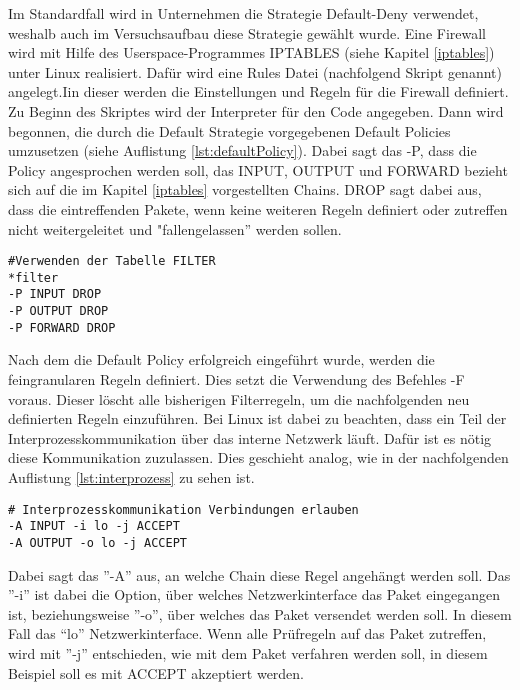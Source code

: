 Im Standardfall wird in Unternehmen die Strategie Default-Deny verwendet, weshalb auch im Versuchsaufbau diese Strategie gewählt wurde. Eine Firewall wird mit Hilfe des Userspace-Programmes IPTABLES (siehe Kapitel \ref{iptables}) unter Linux realisiert. Dafür wird eine Rules Datei (nachfolgend Skript genannt) angelegt.Iin dieser werden die Einstellungen und Regeln für die Firewall definiert. Zu Beginn des Skriptes wird der Interpreter für den Code angegeben. Dann wird begonnen, die durch die Default Strategie vorgegebenen Default Policies umzusetzen (siehe Auflistung \ref{lst:defaultPolicy}). Dabei sagt das -P, dass die Policy angesprochen werden soll, das INPUT, OUTPUT und FORWARD bezieht sich auf die im Kapitel \ref{iptables} vorgestellten Chains. DROP sagt dabei aus, dass die eintreffenden Pakete, wenn keine weiteren Regeln definiert oder zutreffen nicht weitergeleitet und "fallengelassen'' werden sollen.
\newline
\lstset{
	basicstyle=\footnotesize, frame=tb,
	xleftmargin=.2\textwidth, xrightmargin=.2\textwidth
}
\begin{lstlisting}[caption={Default Policy IPTABLE},label=lst:defaultPolicy]
#Verwenden der Tabelle FILTER
*filter
-P INPUT DROP
-P OUTPUT DROP
-P FORWARD DROP
\end{lstlisting}
\vspace{\baselineskip}
Nach dem die Default Policy erfolgreich eingeführt wurde, werden die feingranularen Regeln definiert. Dies setzt die Verwendung des Befehles -F voraus. Dieser löscht alle bisherigen Filterregeln, um die nachfolgenden neu definierten Regeln einzuführen. Bei Linux ist dabei zu beachten, dass ein Teil der Interprozesskommunikation über das interne Netzwerk läuft. Dafür ist es nötig diese Kommunikation zuzulassen. 
Dies geschieht analog, wie in der nachfolgenden Auflistung \ref{lst:interprozess} zu sehen ist. 
\newline
\lstset{
	basicstyle=\footnotesize, frame=tb,
	xleftmargin=.2\textwidth, xrightmargin=.2\textwidth
}
\begin{lstlisting}[caption={Interprozesskommunikation zulassen},label=lst:interprozess]
# Interprozesskommunikation Verbindungen erlauben
-A INPUT -i lo -j ACCEPT
-A OUTPUT -o lo -j ACCEPT
\end{lstlisting}
\vspace{\baselineskip}
Dabei sagt das ''-A'' aus, an welche Chain diese Regel angehängt werden soll. Das ''-i'' ist dabei die Option, über welches Netzwerkinterface das Paket eingegangen ist, beziehungsweise ''-o'', über welches das Paket versendet werden soll. In diesem Fall das ``lo'' Netzwerkinterface. Wenn alle Prüfregeln auf das Paket zutreffen, wird mit ''-j'' entschieden, wie mit dem Paket verfahren werden soll, in diesem Beispiel soll es mit ACCEPT akzeptiert werden. 
